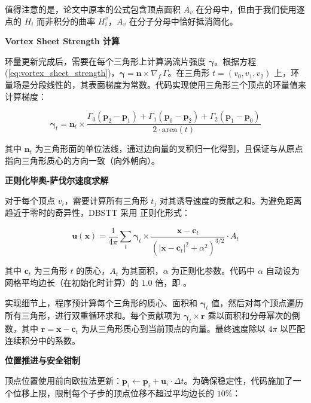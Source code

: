 值得注意的是，论文中原本的公式包含顶点面积 $A_v$ 在分母中，但由于我们使用逐点的 $H_i$ 而非积分的曲率 $H_i^v$，$A_v$ 在分子分母中恰好抵消简化。

\textbf{Vortex Sheet Strength 计算}

环量更新完成后，需要在每个三角形上计算涡流片强度 $\boldsymbol{\gamma}$。根据方程 (\ref{eq:vortex_sheet_strength})，$\boldsymbol{\gamma} = \mathbf{n} \times \nabla_{\!f}\,\Gamma$。在三角形 $t = (v_0, v_1, v_2)$ 上，环量场是分段线性的，其表面梯度为常数。代码实现使用三角形三个顶点的环量值来计算梯度：

\begin{equation}
\boldsymbol{\gamma}_t = \mathbf{n}_t \times \frac{
    \Gamma_0 (\mathbf{p}_2 - \mathbf{p}_1) +
    \Gamma_1 (\mathbf{p}_0 - \mathbf{p}_2) +
    \Gamma_2 (\mathbf{p}_1 - \mathbf{p}_0)
}{2 \cdot \text{area}(t)}
\label{eq:discrete_gamma}
\end{equation}

其中 $\mathbf{n}_t$ 为三角形面的单位法线，通过边向量的叉积归一化得到，且保证与从原点指向三角形质心的方向一致（向外朝向）。

\textbf{正则化毕奥-萨伐尔速度求解}

对于每个顶点 $v_i$，需要计算所有三角形 $t_j$ 对其诱导速度的贡献之和。为避免距离趋近于零时的奇异性，DBSTT 采用 正则化形式：

\begin{equation}
\mathbf{u}(\mathbf{x}) = \frac{1}{4\pi} \sum_{t} \boldsymbol{\gamma}_t \times
    \frac{\mathbf{x} - \mathbf{c}_t}
         {(|\mathbf{x} - \mathbf{c}_t|^2 + \alpha^2)^{3/2}} \cdot A_t
\label{eq:regularized_biot_savart}
\end{equation}

其中 $\mathbf{c}_t$ 为三角形 $t$ 的质心，$A_t$ 为其面积，$\alpha$ 为正则化参数。代码中 $\alpha$ 自动设为网格平均边长（在初始化时计算）的 $1.0$ 倍，即 。

实现细节上，程序预计算每个三角形的质心、面积和 $\boldsymbol{\gamma}_t$ 值，然后对每个顶点遍历所有三角形，进行双重循环求和。每个贡献项为 $\boldsymbol{\gamma}_t \times \mathbf{r}$ 乘以面积和分母幂次的倒数，其中 $\mathbf{r} = \mathbf{x} - \mathbf{c}_t$ 为从三角形质心到当前顶点的向量。最终速度除以 $4\pi$ 以匹配连续积分中的系数。

\textbf{位置推进与安全钳制}

顶点位置使用前向欧拉法更新：$\mathbf{p}_i \leftarrow \mathbf{p}_i + \mathbf{u}_i \cdot \Delta t$。为确保稳定性，代码施加了一个位移上限，限制每个子步的顶点位移不超过平均边长的 $10\%$：

